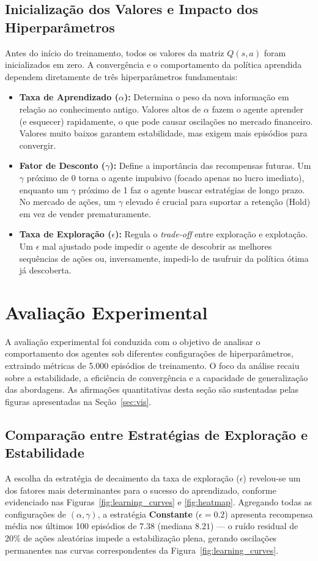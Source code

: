 \documentclass{article}
\begin{document}
\subsection{Inicialização dos Valores e Impacto dos Hiperparâmetros}
Antes do início do treinamento, todos os valores da matriz $Q(s,a)$ foram inicializados em zero. A convergência e o comportamento da política aprendida dependem diretamente de três hiperparâmetros fundamentais:
\begin{itemize}
    \item \textbf{Taxa de Aprendizado ($\alpha$):} Determina o peso da nova informação em relação ao conhecimento antigo. Valores altos de $\alpha$ fazem o agente aprender (e esquecer) rapidamente, o que pode causar oscilações no mercado financeiro. Valores muito baixos garantem estabilidade, mas exigem mais episódios para convergir.
    \item \textbf{Fator de Desconto ($\gamma$):} Define a importância das recompensas futuras. Um $\gamma$ próximo de 0 torna o agente impulsivo (focado apenas no lucro imediato), enquanto um $\gamma$ próximo de 1 faz o agente buscar estratégias de longo prazo. No mercado de ações, um $\gamma$ elevado é crucial para suportar a retenção (Hold) em vez de vender prematuramente.
    \item \textbf{Taxa de Exploração ($\epsilon$):} Regula o \textit{trade-off} entre exploração e explotação. Um $\epsilon$ mal ajustado pode impedir o agente de descobrir as melhores sequências de ações ou, inversamente, impedi-lo de usufruir da política ótima já descoberta.
\end{itemize}

\section{Avaliação Experimental}
A avaliação experimental foi conduzida com o objetivo de analisar o comportamento dos agentes sob diferentes configurações de hiperparâmetros, extraindo métricas de 5.000 episódios de treinamento. O foco da análise recaiu sobre a estabilidade, a eficiência de convergência e a capacidade de generalização das abordagens. As afirmações quantitativas desta seção são sustentadas pelas figuras apresentadas na Seção~\ref{sec:vis}.

\subsection{Comparação entre Estratégias de Exploração e Estabilidade}
A escolha da estratégia de decaimento da taxa de exploração ($\epsilon$) revelou-se um dos fatores mais determinantes para o sucesso do aprendizado, conforme evidenciado nas Figuras~\ref{fig:learning_curves} e \ref{fig:heatmap}. Agregando todas as configurações de $(\alpha, \gamma)$, a estratégia \textbf{Constante} ($\epsilon=0.2$) apresenta recompensa média nos últimos 100 episódios de $7.38$ (mediana $8.21$) — o ruído residual de 20\% de ações aleatórias impede a estabilização plena, gerando oscilações permanentes nas curvas correspondentes da Figura~\ref{fig:learning_curves}.
\end{document}
